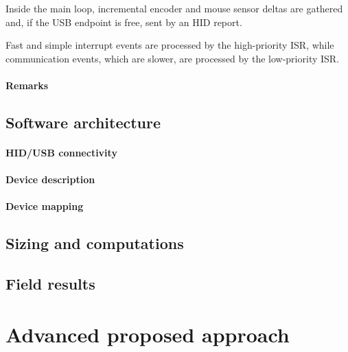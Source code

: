 \documentclass[a4paper,10pt]{article}
\begin{document}
\begin{multicols}{2}
Inside the main loop, incremental encoder and mouse sensor deltas are gathered
and, if the USB endpoint is free, sent by an HID report.

Fast and simple interrupt events are processed by the high-priority ISR, while
communication events, which are slower, are processed by the low-priority ISR.


\paragraph{Remarks}
\TODO


\subsection{Software architecture}

\TODO


\paragraph{HID/USB connectivity}
\TODO


\paragraph{Device description}
\TODO


\paragraph{Device mapping}
\TODO


\subsection{Sizing and computations}

\TODO


\subsection{Field results}

\TODO


\section{Advanced proposed approach}


\end{multicols}
\end{document}

